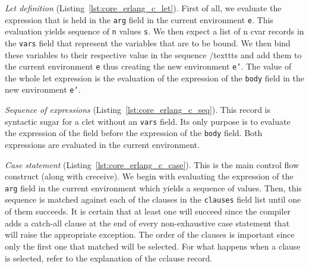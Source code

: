
\emph{Let definition} (Listing~\ref{lst:core_erlang_c_let}).
First of all, we evaluate the expression that is held in the \texttt{arg} field in the
current environment \texttt{e}. This evaluation yields sequence of \texttt{n} values \texttt{s}. We then
expect a list of n c\textunderscore var records in the \texttt{vars} field that represent the variables
that are to be bound. We then bind these variables to their respective value in
the sequence /texttt{s} and add them to the current environment \texttt{e} thus creating the new
environment \texttt{e’}. The value of the whole let expression is the evaluation of the
expression of the \texttt{body} field in the new environment \texttt{e’}.



\emph{Sequence of expressions} (Listing~\ref{lst:core_erlang_c_seq}).
This record is syntactic sugar for a c\textunderscore let without an
\texttt{vars} field. Its only purpose is to evaluate the expression of the
 field before the expression of the \texttt{body} field. Both
expressions are evaluated in the current environment.


\emph{Case statement} (Listing~\ref{lst:core_erlang_c_case}).
This is the main control flow construct (along with c\textunderscore receive). We begin with
evaluating the expression of the \texttt{arg} field in the current environment which
yields a sequence of values. Then, this sequence is matched against each of the
clauses in the \texttt{clauses} field list until one of them succeeds. It is certain
that at least one will succeed since the compiler adds a catch-all clause at
the end of every non-exhaustive case statement that will raise the appropriate
exception. The order of the clauses is important since only the first one that
matched will be selected. For what happens when a clause is selected, refer to
the explanation of the c\textunderscore clause record.




